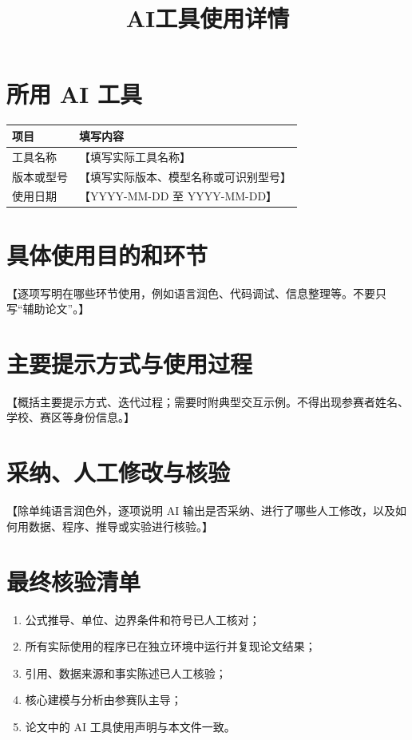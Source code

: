 \documentclass[UTF8,a4paper,11pt,fontset=none]{ctexart}
\title{AI工具使用详情}
\author{}
\date{}
\begin{document}
\maketitle

\section{所用 AI 工具}
\begin{longtable}{p{}p{}}
\toprule
项目 & 填写内容 \\
\midrule
工具名称 & 【填写实际工具名称】 \\
版本或型号 & 【填写实际版本、模型名称或可识别型号】 \\
使用日期 & 【YYYY-MM-DD 至 YYYY-MM-DD】 \\
\bottomrule
\end{longtable}

\section{具体使用目的和环节}
【逐项写明在哪些环节使用，例如语言润色、代码调试、信息整理等。不要只写“辅助论文”。】

\section{主要提示方式与使用过程}
【概括主要提示方式、迭代过程；需要时附典型交互示例。不得出现参赛者姓名、学校、赛区等身份信息。】

\section{采纳、人工修改与核验}
【除单纯语言润色外，逐项说明 AI 输出是否采纳、进行了哪些人工修改，以及如何用数据、程序、推导或实验进行核验。】

\section{最终核验清单}
\begin{enumerate}[label=\arabic*)]
  \item 公式推导、单位、边界条件和符号已人工核对；
  \item 所有实际使用的程序已在独立环境中运行并复现论文结果；
  \item 引用、数据来源和事实陈述已人工核验；
  \item 核心建模与分析由参赛队主导；
  \item 论文中的 AI 工具使用声明与本文件一致。
\end{enumerate}
\end{document}
